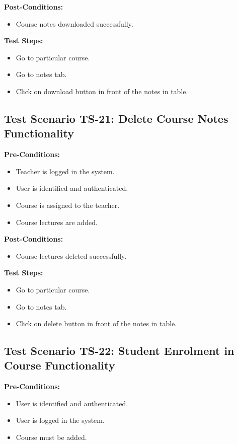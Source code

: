 \textbf{Post-Conditions: }
\begin{itemize}

\item Course notes downloaded successfully.

\end{itemize}
\textbf{Test Steps:}
\begin{itemize}

\item Go to particular course.
\item Go to notes tab.
\item Click on download button in front of the notes in table.

\end{itemize}


\subsection{Test Scenario TS-21: Delete Course Notes Functionality}
\textbf{Pre-Conditions: }
\begin{itemize}

\item Teacher is logged in the system.
\item User is identified and authenticated.
\item Course is assigned to the teacher.
\item Course lectures are added.

\end{itemize}

\textbf{Post-Conditions: }
\begin{itemize}

\item Course lectures deleted successfully.

\end{itemize}
\textbf{Test Steps:}
\begin{itemize}

\item Go to particular course.
\item Go to notes tab.
\item Click on delete button in front of the notes in table.

\end{itemize}




\subsection{Test Scenario TS-22: Student Enrolment in Course Functionality}
\textbf{Pre-Conditions: }
\begin{itemize}

\item User is identified and authenticated.
\item User is logged in the system.
\item Course must be added.

\end{itemize}

